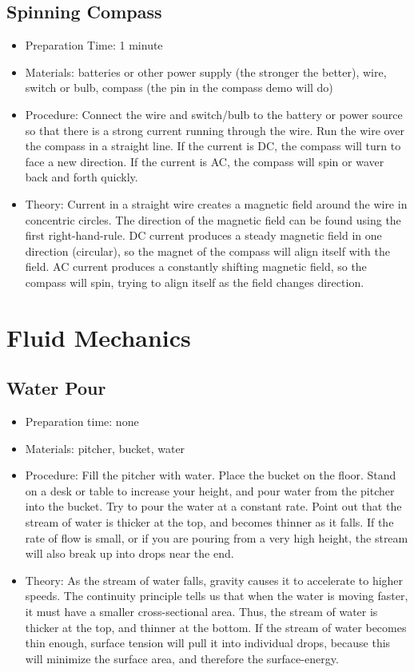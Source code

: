 \subsection{Spinning Compass}
\begin{itemize}
\item{Preparation Time: 1 minute}
\item{Materials: batteries or other power supply (the stronger the better), wire, switch or bulb, compass (the pin in the compass demo will do)}
\item{Procedure: Connect the wire and switch/bulb to the battery or power source so that there is a strong current running through the wire. Run the wire over the compass in a straight line. If the current is DC, the compass will turn to face a new direction. If the current is AC, the compass will spin or waver back and forth quickly.}
\item{Theory: Current in a straight wire creates a magnetic field around the wire in concentric circles. The direction of the magnetic field can be found using the first right-hand-rule. DC current produces a steady magnetic field in one direction (circular), so the magnet of the compass will align itself with the field. AC current produces a constantly shifting magnetic field, so the compass will spin, trying to align itself as the field changes direction.}
\end{itemize}

\section{Fluid Mechanics}

\subsection{Water Pour}
\begin{itemize}
\item{Preparation time: none}
\item{Materials: pitcher, bucket, water}
\item{Procedure: Fill the pitcher with water. Place the bucket on the floor. Stand on a desk or table to increase your height, and pour water from the pitcher into the bucket. Try to pour the water at a constant rate. Point out that the stream of water is thicker at the top, and becomes thinner as it falls. If the rate of flow is small, or if you are pouring from a very high height, the stream will also break up into drops near the end.}
\item{Theory: As the stream of water falls, gravity causes it to accelerate to higher speeds. The continuity principle tells us that when the water is moving faster, it must have a smaller cross-sectional area. Thus, the stream of water is thicker at the top, and thinner at the bottom. If the stream of water becomes thin enough, surface tension will pull it into individual drops, because this will minimize the surface area, and therefore the surface-energy.}
\end{itemize}

